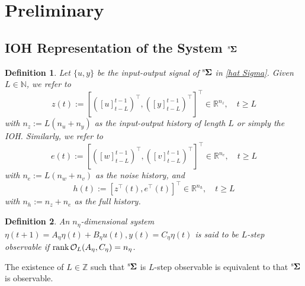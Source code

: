 \documentclass[preprint,5p,times,twocolumn]{elsarticle}
\newcommand{\bm}[1]{{\mbox{\boldmath $#1$}}}
\newtheorem{definition}{Definition}
\def\rank{{\rm rank} \hspace{0.5mm}}
\def\rms{{}^{\rm s}\hspace{-0.2mm}}
\def\rmsK{{}^{\rm s}\hspace{-0.4mm}}
\begin{document}
\section{Preliminary}

\subsection{IOH Representation of the System $\rms {\bm \Sigma}$}
\begin{definition}\label{def_1}
Let $\{u,y\}$ be the input-output signal of $\rms {\bm \Sigma}$ in \eqref{hat Sigma}. Given $L \in \mathbb N$, we refer to
\begin{equation}\label{def_IOH}
    z(t) := [([u]^{t-1}_{t-L})^{\top}, ([y]^{t-1}_{t-L})^{\top}]^{\top} \in \mathbb R^{n_z}, \quad t \geq L
\end{equation}
with $n_z := L(n_u + n_y)$ as the {\it input-output history of length $L$} or simply the {\it IOH}. 
Similarly, we refer to
\begin{equation}
    e(t) := [([w]^{t-1}_{t-L})^{\top}, ([v]^{t-1}_{t-L})^{\top}]^{\top} \in \mathbb R^{n_e}, \quad t \geq L
\end{equation}
with $n_e := L(n_w + n_v)$ as the noise history, and 
\begin{equation}\label{def_fullH}
    h(t) := [z^{\top}(t), e^{\top}(t)]^{\top} \in \mathbb R^{n_h}, \quad t \geq L
\end{equation}
with $n_h := n_z + n_e$ as the full history. 
\end{definition}


\begin{definition}\label{def_Lmeas} \cite{rugh1996linear}
An $n_{\eta}$-dimensional system $\eta(t+1) = A_{\eta}\eta(t) + B_{\eta}u(t), y(t)=C_{\eta}\eta(t)$ is said to be \it $L$-step observable if $\rank \mathcal O_L(A_{\eta},C_{\eta})=n_{\eta}$.
\end{definition}
The existence of $L \in \mathbb Z$ such that $\rms{\bm \Sigma}$ is $L$-step observable is equivalent to that $\rms{\bm \Sigma}$ is observable.
\end{document}
